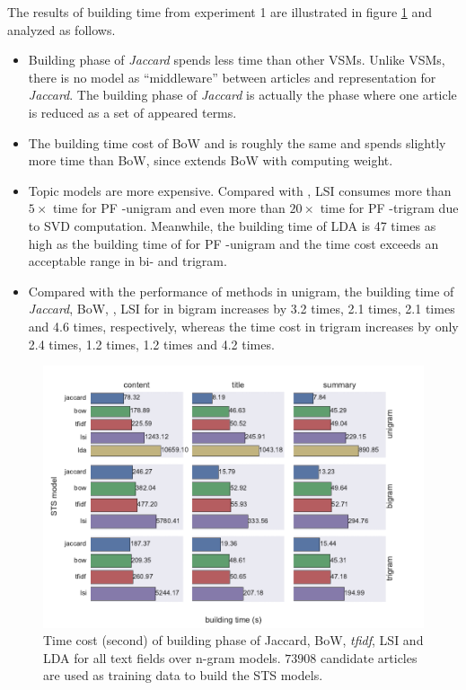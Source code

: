 The results of building time from experiment 1 are illustrated in figure \ref{fig:build_time} and analyzed as follows. 

\begin{itemize}
\item[1] Building phase of \textit{Jaccard} spends less time than other VSMs. Unlike VSMs, there is no model as ``middleware'' between articles and representation for \textit{Jaccard}. The building phase of \textit{Jaccard} is actually the phase where one article is reduced as a set of appeared terms. 

\item[2] The building time cost of BoW and \tfidf{} is roughly the same and \tfidf{} spends slightly more time than BoW, since \tfidf{} extends BoW with computing \tfidf{} weight. 

\item[3] Topic models are more expensive. Compared with \tfidf{}, LSI consumes more than $5 \times$ time for PF \icontent{}-unigram and even more than $20 \times$ time for PF \icontent{}-trigram due to SVD computation. Meanwhile, the building time of LDA is 47 times as high as the building time of \tfidf{} for PF \icontent{}-unigram and the time cost exceeds an acceptable range in bi- and trigram. 

\item[4] Compared with the performance of methods in unigram, the building time of \textit{Jaccard}, BoW, \tfidf{}, LSI for \icontent{} in bigram increases by 3.2 times, 2.1 times, 2.1 times and 4.6 times, respectively, whereas the time cost in trigram increases by only 2.4 times, 1.2 times, 1.2 times and 4.2 times. 

\end{itemize}

\begin{figure}[!htb]
    \centering
    \includegraphics[width=\textwidth]{fig/building_time}
    \caption[Time cost (second) of building phase of Jaccard, BoW, \textit{tfidf}, LSI and LDA for all text fields over n-gram models]{Time cost (second) of building phase of Jaccard, BoW, \textit{tfidf}, LSI and LDA for all text fields over n-gram models. $73908$ candidate articles are used as training data to build the STS models.}
    \label{fig:build_time}
\end{figure}
